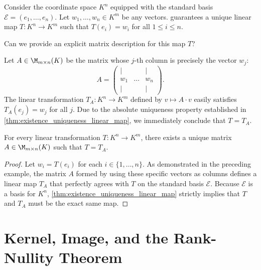 \begin{example}
\label{ex:linear_map_std_basis}
Consider the coordinate space $K^n$ equipped with the standard basis $\mathcal{E} = (e_1, \dots, e_n)$. Let $w_1, \dots, w_n \in K^m$ be any vectors.  guarantees a unique linear map $T: K^n \to K^m$ such that $T(e_i) = w_i$ for all $1 \le i \le n$.

\begin{question}
Can we provide an explicit matrix description for this map $T$?
\end{question}

\begin{answer}
Let $A \in \M_{m \times n}(K)$ be the matrix whose $j$-th column is precisely the vector $w_j$:
\[
A = 
\begin{pmatrix}
| & & | \\
w_1 & \dots & w_n \\
| & & |
\end{pmatrix}.
\]
The linear transformation $T_A: K^n \to K^m$ defined by $v \mapsto A \cdot v$ easily satisfies $T_A(e_j) = w_j$ for all $j$. Due to the absolute uniqueness property established in \cref{thm:existence_uniqueness_linear_map}, we immediately conclude that $T = T_A$.
\end{answer}
\end{example}

\begin{lemma}
\label{lem:all_linear_maps_are_matrices}
For every linear transformation $T: K^n \to K^m$, there exists a unique matrix $A \in \M_{m \times n}(K)$ such that $T = T_A$.
\end{lemma}

\begin{proof}
Let $w_i = T(e_i)$ for each $i \in \{1, \dots, n\}$. As demonstrated in the preceding example, the matrix $A$ formed by using these specific vectors as columns defines a linear map $T_A$ that perfectly agrees with $T$ on the standard basis $\mathcal{E}$. Because $\mathcal{E}$ is a basis for $K^n$, \cref{thm:existence_uniqueness_linear_map} strictly implies that $T$ and $T_A$ must be the exact same map.
\end{proof}
\section{Kernel, Image, and the Rank-Nullity Theorem}

